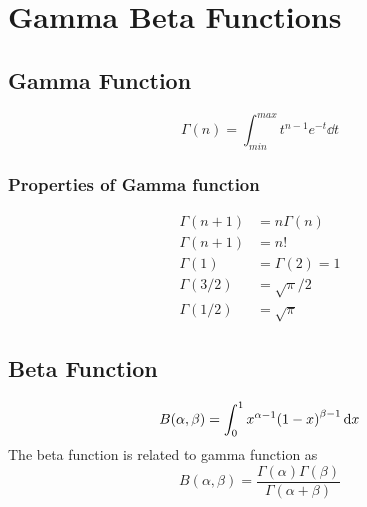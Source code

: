 

\chapter{Gamma Beta Functions}
\label{appendix3.gamma-beta}

\section{Gamma Function}
\begin{equation}
	\Gamma(n) = \int_{min}^{max} t^{n-1} e^{-t}\dd{t}
\end{equation}

\subsection{Properties of Gamma function}
\begin{align}
	\Gamma (n + 1) &= n \Gamma(n)\\
	\Gamma(n+1) &= n! \\
	\Gamma(1) &= \Gamma(2) = 1\\
	\Gamma(3/2) &= \sqrt{\pi}/2\\
	\Gamma(1/2) &= \sqrt{\pi}
\end{align}


\section{Beta Function}
\begin{equation}
	B(\alpha, \beta) = \int_{0}^{1} x^{\alpha - 1} \qty(1 - x)^{\beta - 1} \dd{x}
\end{equation}
The beta function is related to gamma function as
\begin{equation}
B(\alpha, \beta) = \frac{\Gamma(\alpha) \Gamma(\beta)}{\Gamma(\alpha + \beta)}
\end{equation}